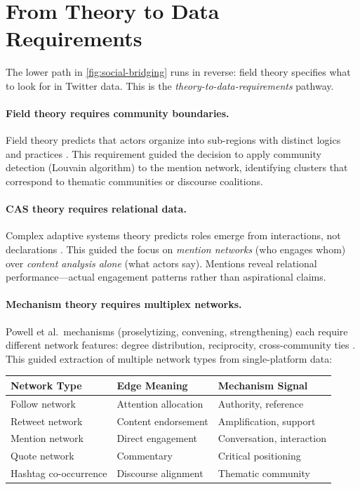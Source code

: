 \documentclass[../main.tex]{subfiles}
\begin{document}
\section{From Theory to Data Requirements}
\label{sec:social-theory-data}

The lower path in \cref{fig:social-bridging} runs in reverse:
field theory specifies what to look for in Twitter data.
This is the \emph{theory-to-data-requirements} pathway.

\paragraph{Field theory requires community boundaries.}
Field theory predicts that actors organize into sub-regions with
distinct logics and practices \parencite{powell2017organizational}.
This requirement guided the decision to apply community detection
(Louvain algorithm) to the mention network, identifying clusters
that correspond to thematic communities or discourse coalitions.

\paragraph{CAS theory requires relational data.}
Complex adaptive systems theory predicts roles emerge from interactions,
not declarations \parencite{holland2012signals}.
This guided the focus on \emph{mention networks} (who engages whom)
over \emph{content analysis alone} (what actors say).
Mentions reveal relational performance---actual engagement patterns
rather than aspirational claims.

\paragraph{Mechanism theory requires multiplex networks.}
Powell et al.\ mechanisms (proselytizing, convening, strengthening)
each require different network features: degree distribution,
reciprocity, cross-community ties \parencite{powell2017organizational}.
This guided extraction of multiple network types from single-platform data:

\tableminimal
\begin{center}
\begin{tabular}{@{}p{2.5cm}p{4cm}p{4.5cm}@{}}
\toprule
\textbf{Network Type} & \textbf{Edge Meaning} & \textbf{Mechanism Signal} \\
\midrule
Follow network & Attention allocation & Authority, reference \\
Retweet network & Content endorsement & Amplification, support \\
Mention network & Direct engagement & Conversation, interaction \\
Quote network & Commentary & Critical positioning \\
Hashtag co-occurrence & Discourse alignment & Thematic community \\
\bottomrule
\end{tabular}
\end{center}
\end{document}
